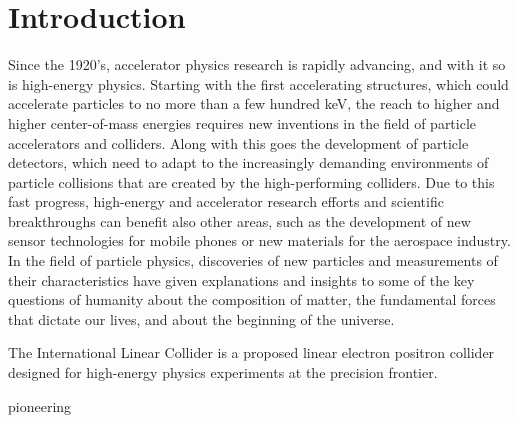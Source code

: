 \chapter{Introduction}
\label{Introduction}
Since the 1920's, accelerator physics research is rapidly advancing, and with it so is high-energy physics.
Starting with the first accelerating structures, which could accelerate particles to no more than a few hundred \si{\keV}, the reach to higher and higher center-of-mass energies requires new inventions in the field of particle accelerators and colliders.
Along with this goes the development of particle detectors, which need to adapt to the increasingly demanding environments of particle collisions that are created by the high-performing colliders.
Due to this fast progress, high-energy and accelerator research efforts and scientific breakthroughs can benefit also other areas, such as the development of new sensor technologies for mobile phones or new materials for the aerospace industry.
\\In the field of particle physics, discoveries of new particles and measurements of their characteristics have given explanations and insights to some of the key questions of humanity about the composition of matter, the fundamental forces that dictate our lives, and about the beginning of the universe.

The International Linear Collider is a proposed linear electron positron collider designed for
high-energy physics experiments at the precision frontier.


pioneering